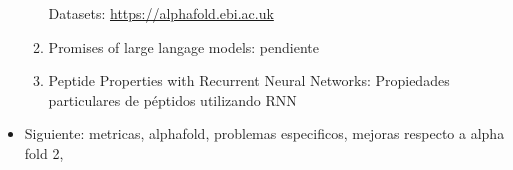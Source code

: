 \documentclass[11pt, twoside]{report}
\begin{document}
\begin{itemize}
\begin{enumerate}
        Datasets: \url{https://alphafold.ebi.ac.uk}
        \item Promises of large langage models: pendiente
        \item Peptide Properties with Recurrent Neural Networks: Propiedades particulares de péptidos utilizando RNN
    \end{enumerate}
    \item Siguiente: metricas, alphafold, problemas especificos, mejoras respecto a alpha fold 2, 
    


\end{itemize}



\end{document}
